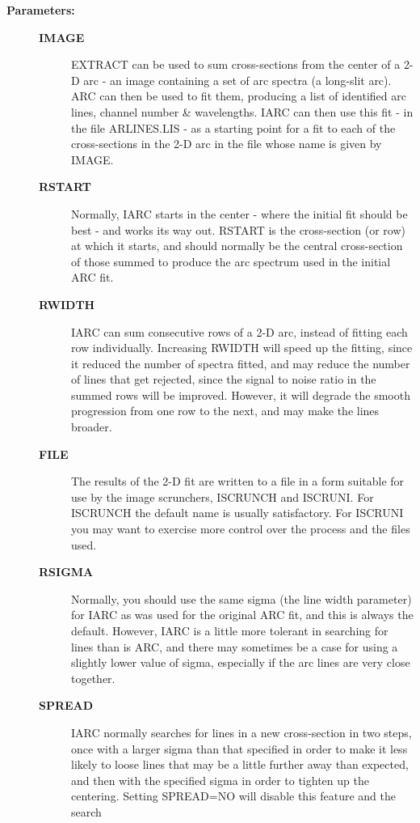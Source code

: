 \begin{description}
\begin{description}
\item [\textbf{Parameters:}]
\begin{description}
\item [\textbf{IMAGE}]
 EXTRACT can be used to sum cross-sections from the
 center of a 2-D arc - an image containing a set of arc
 spectra (a long-slit arc).  ARC can then be used to fit
 them, producing a list of identified arc lines, channel
 number \& wavelengths.  IARC can then use this fit - in
 the file ARLINES.LIS - as a starting point for a fit to
 each of the cross-sections in the 2-D arc in the file
 whose name is given by IMAGE.
\item [\textbf{RSTART}]
 Normally, IARC starts in the center - where the initial
 fit should be best - and works its way out.  RSTART is
 the cross-section (or row) at which it starts, and should
 normally be the central cross-section of those summed to
 produce the arc spectrum used in the initial ARC fit.
\item [\textbf{RWIDTH}]
 IARC can sum consecutive rows of a 2-D arc, instead of
 fitting each row individually.  Increasing RWIDTH will
 speed up the fitting, since it reduced the number of
 spectra fitted, and may reduce the number of lines that
 get rejected, since the signal to noise ratio in the
 summed rows will be improved.  However, it will degrade
 the smooth progression from one row to the next, and may
 make the lines broader.
\item [\textbf{FILE}]
 The results of the 2-D fit are written to a file in a
 form suitable for use by the image scrunchers, ISCRUNCH
 and ISCRUNI.  For ISCRUNCH the default name is usually
 satisfactory.  For ISCRUNI you may want to exercise more
 control over the process and the files used.
\item [\textbf{RSIGMA}]
 Normally, you should use the same sigma (the line width
 parameter) for IARC as was used for the original ARC fit,
 and this is always the default.  However, IARC is a
 little more tolerant in searching for lines than is ARC,
 and there may sometimes be a case for using a slightly
 lower value of sigma, especially if the arc lines are
 very close together.
\item [\textbf{SPREAD}]
 IARC normally searches for lines in a new cross-section
 in two steps, once with a larger sigma than that specified
 in order to make it less likely to loose lines that may
 be a little further away than expected, and then with
 the specified sigma in order to tighten up the centering.
 Setting SPREAD=NO will disable this feature and the search

\end{description}
\end{description}
\end{description}
